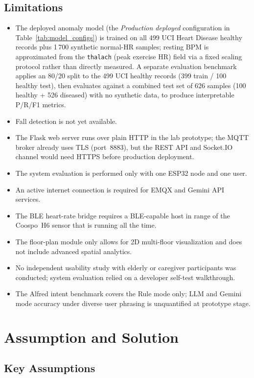\subsection{Limitations}

\begin{itemize}
    \item The deployed anomaly model (the \emph{Production deployed} configuration in Table~\ref{tab:model_configs}) is trained on all 499 UCI Heart Disease healthy records plus 1\,700 synthetic normal-HR samples; resting BPM is approximated from the \texttt{thalach} (peak exercise HR) field via a fixed scaling protocol rather than directly measured. A separate evaluation benchmark applies an 80/20 split to the 499 UCI healthy records (399 train / 100 healthy test), then evaluates against a combined test set of 626 samples (100 healthy + 526 diseased) with no synthetic data, to produce interpretable P/R/F1 metrics.
    \item Fall detection is not yet available.
    \item The Flask web server runs over plain HTTP in the lab prototype; the MQTT broker already uses TLS (port~8883), but the REST API and Socket.IO channel would need HTTPS before production deployment.
    \item The system evaluation is performed only with one ESP32 node and one user.
    \item An active internet connection is required for EMQX and Gemini API services.
    \item The BLE heart-rate bridge requires a BLE-capable host in range of the Coospo~H6 sensor that is running all the time.
    \item The floor-plan module only allows for 2D multi-floor visualization and does not include advanced spatial analytics.
    \item No independent usability study with elderly or caregiver participants was conducted; system evaluation relied on a developer self-test walkthrough.
    \item The Alfred intent benchmark covers the Rule mode only; LLM and Gemini mode accuracy under diverse user phrasing is unquantified at prototype stage.
\end{itemize}

\section{Assumption and Solution}

\subsection{Key Assumptions}


